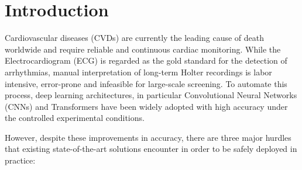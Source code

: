 \documentclass[pdflatex,sn-mathphys-num]{sn-jnl}
\theoremstyle{thmstyleone}
\theoremstyle{thmstyletwo}
\theoremstyle{thmstylethree}
\begin{document}
\maketitle

\section{Introduction}

Cardiovascular diseases (CVDs) are currently the leading cause of death worldwide and require reliable and continuous cardiac monitoring. While the Electrocardiogram (ECG) is regarded as the gold standard for the detection of arrhythmias, manual interpretation of long-term Holter recordings is labor intensive, error-prone and infeasible for large-scale screening. To automate this process, deep learning architectures, in particular Convolutional Neural Networks (CNNs) \cite{takalo-mattila_inter-patient_2018, guo_inter-patient_2019} and Transformers \cite{akan_ecgformer_2024} have been widely adopted with high accuracy under the controlled experimental conditions. 

However, despite these improvements in accuracy, there are three major hurdles that existing state-of-the-art solutions encounter in order to be safely deployed in practice: 
\end{document}
